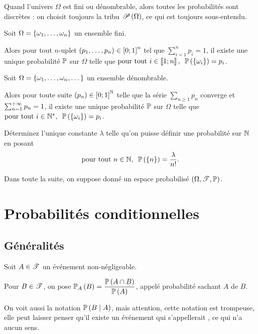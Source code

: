 Quand l'univers \(\Omega\) est fini ou dénombrable, alors toutes les probabilités sont discrètes : on choisit toujours la tribu \(\P{\Omega}\), ce qui est toujours sous-entendu.

\begin{prop}
Soit \(\Omega=\accol{\omega_1,\dots,\omega_n}\) un ensemble fini.

Alors pour tout \(n\)-uplet \(\paren{p_1,\dots,p_n}\in\intervii{0}{1}^n\) tel que \(\sum_{i=1}^np_i=1\), il existe une unique probabilité \(\prem\) sur \(\Omega\) telle que \(\quantifs{\tpt i\in\interventierii{1}{n}}\proba{\accol{\omega_i}}=p_i\).
\end{prop}

\begin{prop}
Soit \(\Omega=\accol{\omega_1,\dots,\omega_n,\dots}\) un ensemble dénombrable.

Alors pour toute suite \(\paren{p_n}\in\intervii{0}{1}^\N\) telle que la série \(\sum_{n\geq1}p_n\) converge et \(\sum_{n=1}^{\pinf}p_n=1\), il existe une unique probabilité \(\prem\) sur \(\Omega\) telle que \(\quantifs{\tpt i\in\Ns}\proba{\accol{\omega_i}}=p_i\).
\end{prop}

\begin{exo}
Déterminez l'unique constante \(\lambda\) telle qu'on puisse définir une probabilité sur \(\N\) en posant \[\quantifs{\tpt n\in\N}\proba{\accol{n}}=\dfrac{\lambda}{n!}.\]
\end{exo}

Dans toute la suite, on suppose donné un espace probabilisé \(\anneau{\Omega}[\fami{T}][\prem]\).

\section{Probabilités conditionnelles}

\subsection{Généralités}

\begin{defi}
Soit \(A\in\fami{T}\) un événement non-négligeable.

Pour \(B\in\fami{T}\), on pose \(\probacond{B}{A}=\dfrac{\proba{A\inter B}}{\proba{A}}\), appelé probabilité sachant \(A\) de \(B\).
\end{defi}

On voit aussi la notation \(\proba{B\tq A}\), mais attention, cette notation est trompeuse, elle peut laisser penser qu'il existe un événement qui s'appellerait , ce qui n'a aucun sens.

